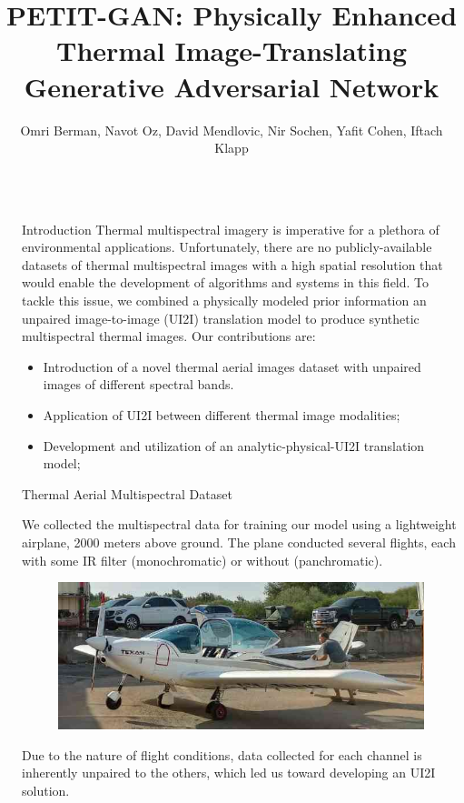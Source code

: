 \documentclass[final]{beamer}
\title{PETIT-GAN: Physically Enhanced Thermal Image-Translating Generative Adversarial Network}
\author{Omri Berman, Navot Oz, David Mendlovic, Nir Sochen, Yafit Cohen, Iftach Klapp}
\institute[shortinst]{Tel Aviv University, Tel Aviv, Israel \\Agricultural Research Organization - Volcani Institute, Rishon LeZion, Israel}
\newlength{\sepwidth}
\newlength{\colwidth}
\newcommand{\separatorcolumn}{\begin{column}{\sepwidth}\end{column}}
\begin{document}
\begin{frame}[t]
\begin{columns}[t]
\separatorcolumn


\begin{column}{\colwidth}

  \begin{block}{Introduction}
    Thermal multispectral imagery is imperative for a plethora of environmental applications.
    Unfortunately, there are no publicly-available datasets of thermal multispectral images with a high spatial resolution that would enable the development of algorithms and systems in this field.    
    To tackle this issue, we combined a physically modeled prior information an unpaired image-to-image (UI2I) translation model to produce synthetic multispectral thermal images.
    Our contributions are:
    \begin{itemize}
      \item Introduction of a novel thermal aerial images dataset with unpaired images of different spectral bands.
      \item Application of UI2I between different thermal image modalities;
      \item Development and utilization of an analytic-physical-UI2I translation model;
    \end{itemize}                
  \end{block}

  \begin{block}{Thermal Aerial Multispectral Dataset}

    We collected the multispectral data for training our model using a lightweight airplane, 2000 meters above ground.
    The plane conducted several flights, each with some IR filter (monochromatic) or without (panchromatic).
    \begin{figure}
      \centering
      \includegraphics[width=\textwidth]{../figs/data/light_airplane.jpeg}
    \end{figure}
    Due to the nature of flight conditions, data collected for each channel is inherently unpaired to the others, which led us toward developing an UI2I solution.    
  \end{block}


\end{column}
\end{columns}
\end{frame}
\end{document}
